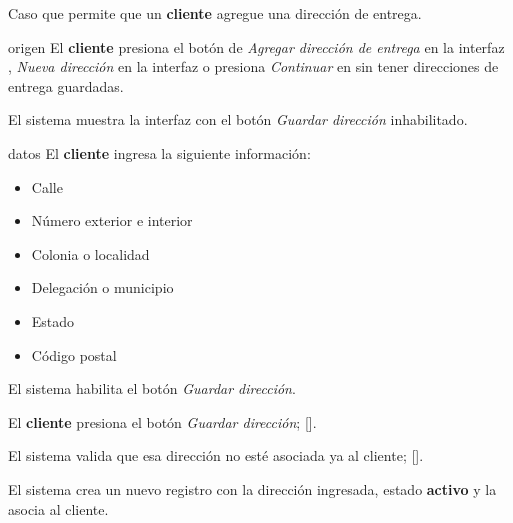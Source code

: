 %
%

{
  Caso que permite que un \textbf{cliente} agregue una dirección de entrega.

  \begin{trayectoriaPrincipal}

    \item[origen] El \textbf{cliente} presiona el botón de
      \textit{Agregar dirección de entrega} en la interfaz
      , \textit{Nueva dirección} en
      la interfaz  o
      presiona \textit{Continuar} en
       sin tener direcciones
      de entrega guardadas.

    \item El sistema muestra la interfaz
       con el botón
      \textit{Guardar dirección} inhabilitado.

    \item[datos] El \textbf{cliente} ingresa la siguiente información:
      \begin{itemize}
        \item Calle
        \item Número exterior e interior
        \item Colonia o localidad
        \item Delegación o municipio
        \item Estado
        \item Código postal
      \end{itemize}

    \item El sistema habilita el botón \textit{Guardar dirección}.

    \item El \textbf{cliente} presiona el botón \textit{Guardar dirección};
      [].

    \item El sistema valida que esa dirección no esté asociada ya al cliente;
      [].

    \item El sistema crea un nuevo registro con la dirección ingresada,
      estado \textbf{activo} y la asocia al cliente.


\end{trayectoriaPrincipal}}
